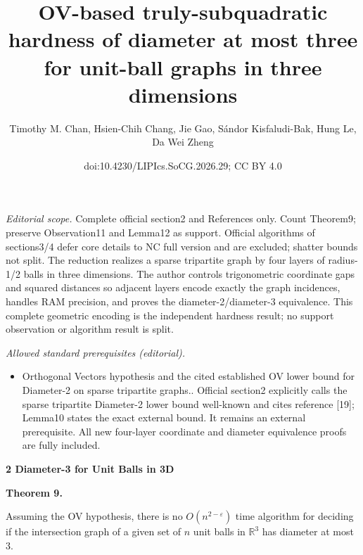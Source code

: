 \documentclass[10pt,a4paper]{article}
\title{OV-based truly-subquadratic hardness of diameter at most three for unit-ball graphs in three dimensions}
\author{Timothy M. Chan, Hsien-Chih Chang, Jie Gao, Sándor Kisfaludi-Bak, Hung Le, Da Wei Zheng}
\date{doi:10.4230/LIPIcs.SoCG.2026.29; CC BY 4.0}
\begin{document}
\maketitle
\noindent\textit{Editorial scope.} Complete official section2 and References only. Count Theorem9; preserve Observation11 and Lemma12 as support. Official algorithms of sections3/4 defer core details to NC full version and are excluded; shatter bounds not split. The reduction realizes a sparse tripartite graph by four layers of radius-1/2 balls in three dimensions. The author controls trigonometric coordinate gaps and squared distances so adjacent layers encode exactly the graph incidences, handles RAM precision, and proves the diameter-2/diameter-3 equivalence. This complete geometric encoding is the independent hardness result; no support observation or algorithm result is split.\par\medskip
\noindent\textit{Allowed standard prerequisites (editorial).}\begin{itemize}
\item Orthogonal Vectors hypothesis and the cited established OV lower bound for Diameter-2 on sparse tripartite graphs.. Official section2 explicitly calls the sparse tripartite Diameter-2 lower bound well-known and cites reference [19]; Lemma10 states the exact external bound. It remains an external prerequisite. All new four-layer coordinate and diameter equivalence proofs are fully included.
\end{itemize}\medskip
\par\medskip\noindent\textbf{2 Diameter-3 for Unit Balls in 3D}\par

\par\medskip\noindent\textbf{Theorem 9.}\par
Assuming the OV hypothesis, there is no $O(n^{2-\varepsilon})$ time algorithm for deciding if the intersection graph of a given set of $n$ unit balls in $\mathbb{R}^{3}$ has diameter at most 3.
\par
\par
\par
\end{document}
